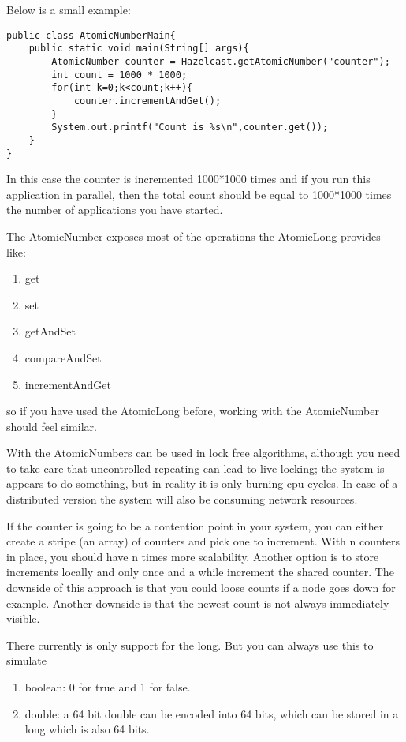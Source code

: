 Below is a small example:
\begin{verbatim}
public class AtomicNumberMain{
    public static void main(String[] args){
        AtomicNumber counter = Hazelcast.getAtomicNumber("counter");
        int count = 1000 * 1000;
        for(int k=0;k<count;k++){
            counter.incrementAndGet();
        }
        System.out.printf("Count is %s\n",counter.get());
    }
}
\end{verbatim}
In this case the counter is incremented 1000*1000 times and if you run this application
in parallel, then the total count should be equal to 1000*1000 times the number of applications
you have started.

The AtomicNumber exposes most of the operations the AtomicLong provides like:
\begin{enumerate}
\item get
\item set
\item getAndSet
\item compareAndSet
\item incrementAndGet
\end{enumerate}
so if you have used the AtomicLong before, working with the AtomicNumber should feel similar.

With the AtomicNumbers can be used in lock free algorithms, although you need to 
take care that uncontrolled repeating can lead to live-locking; the system is appears to do
something, but in reality it is only burning cpu cycles. In case of a distributed version 
the system will also be consuming network resources. 

If the counter is going to be a contention point in your system, you can either create
a stripe (an array) of counters and pick one to increment. With n counters in place, you 
should have n times more scalability. Another option is to store increments locally and 
only once and a while increment the shared counter. The downside of this approach is that
you could loose counts if a node goes down for example. Another downside is that the newest
count is not always immediately visible. 

There currently is only support for the long. But you can always use this to simulate
\begin{enumerate}
\item boolean: 0 for true and 1 for false.
\item double: a 64 bit double can be encoded into 64 bits, which can be stored in a long 
      which is also 64 bits.
\end{enumerate}



